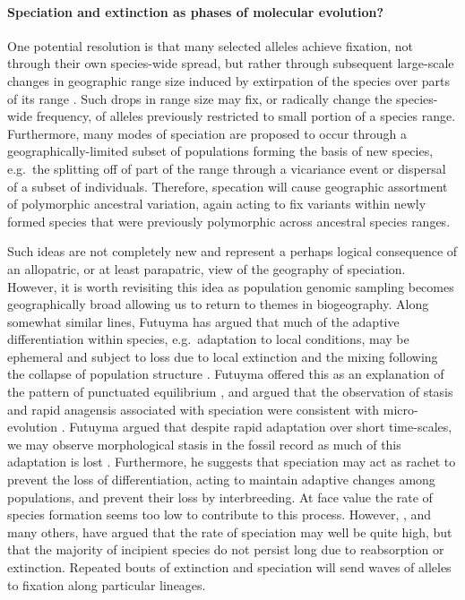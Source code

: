 \documentclass{article}
\begin{document}
\paragraph{Speciation and extinction as phases of molecular evolution?}
One potential resolution is that many selected alleles achieve
fixation, not through their own species-wide spread, but rather
through subsequent large-scale changes in geographic range size
induced by extirpation of the species over parts of its range
\citep[see ][ for how such a model could be constructed]{barton2013modelling}. 
Such drops in range size may fix, or radically change the species-wide frequency, 
of alleles previously restricted to small portion of a species range. 
Furthermore, many modes of speciation are proposed to occur through a
geographically-limited subset of populations forming the basis of new species, 
e.g.\ the splitting off of part of the range through a vicariance event 
or dispersal of a subset of individuals. 
Therefore, specation will cause geographic assortment of
polymorphic ancestral variation, again acting to fix variants within
newly formed species that were previously polymorphic across ancestral species ranges. 

Such ideas are not completely new and represent a perhaps logical consequence of
an allopatric, or at least parapatric, view of the geography of speciation.
However, it is worth revisiting this idea as population genomic
sampling becomes geographically broad allowing us to return to themes
in biogeography. 
Along somewhat similar lines, Futuyma has argued that much of the adaptive differentiation within species,
e.g.\ adaptation to local conditions, 
may be ephemeral and subject to loss due to local extinction and the mixing 
following the collapse of population structure \citep{Futuyma:10,FUTUYMA:87}. 
Futuyma offered this as an explanation of the pattern of punctuated equilibrium \citep{eldredgegould72}, 
and argued that the observation of stasis and rapid anagensis associated with speciation 
were consistent with micro-evolution \citep[see also ][]{Futuyma:1989editedbook}. 
Futuyma argued that despite rapid adaptation over short time-scales, we
may observe morphological stasis in the fossil record as much of this adaptation is lost 
\citep[see also][]{lieberman:96,Eldredge:05}. 
Furthermore, he suggests that speciation
may act as rachet to prevent the loss of differentiation, acting to
maintain adaptive changes among populations, and prevent their loss by interbreeding. 
At face value the rate of species formation seems too low to contribute to this process. 
However, \citep{Rosenblum:12}, and many others, 
have argued that the rate of speciation may well be quite high,
but that the majority of incipient species do not persist long due to reabsorption or extinction. 
Repeated bouts of extinction and speciation will send waves of alleles
to fixation along particular lineages. 
\end{document}
